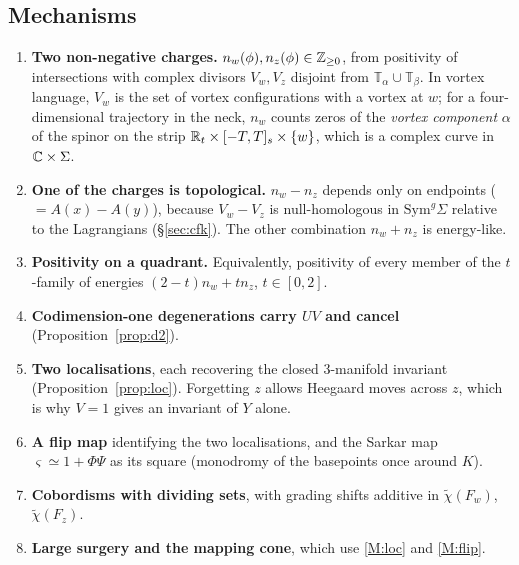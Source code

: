 \subsection{Mechanisms}
\begin{enumerate}[label=(M\arabic*),leftmargin=2.6em]
\item\label{M:charges} \textbf{Two non-negative charges.}  $n_w(\phi),n_z(\phi)\in\mathbb{Z}_{\ge0}$, from positivity
of intersections with complex divisors $V_w,V_z$ disjoint from $\mathbb T_\alpha\cup\mathbb T_\beta$.
In vortex language, $V_w$ is the set of vortex configurations with a vortex at $w$; for a
four-dimensional trajectory in the neck, $n_w$ counts zeros of the \emph{vortex component} $\alpha$
of the spinor on the strip $\mathbb{R}_t\times[-T,T]_s\times\{w\}$, which is a complex curve in $\mathbb{C}\times\Sigma$.
\item\label{M:alex} \textbf{One of the charges is topological.} $n_w-n_z$ depends only on endpoints
($=A(x)-A(y)$), because $V_w-V_z$ is null-homologous in $\mathrm{Sym}^g\Sigma$ relative to the Lagrangians
(\S\ref{sec:cfk}).  The other combination $n_w+n_z$ is energy-like.
\item\label{M:quadrant} \textbf{Positivity on a quadrant.} Equivalently, positivity of every member of
the $t$-family of energies $(2-t)n_w+tn_z$, $t\in[0,2]$.
\item\label{M:degen} \textbf{Codimension-one degenerations carry $UV$ and cancel} (Proposition~\ref{prop:d2}).
\item\label{M:loc} \textbf{Two localisations}, each recovering the closed $3$-manifold invariant
(Proposition~\ref{prop:loc}).  Forgetting $z$ allows Heegaard moves across $z$, which is why
$V=1$ gives an invariant of $Y$ alone.
\item\label{M:flip} \textbf{A flip map} identifying the two localisations, and the Sarkar map
$\varsigma\simeq 1+\Phi\Psi$ as its square (monodromy of the basepoints once around $K$).
\item\label{M:cob} \textbf{Cobordisms with dividing sets}, with grading shifts additive in
$\tilde\chi(F_w)$, $\tilde\chi(F_z)$.
\item\label{M:surg} \textbf{Large surgery and the mapping cone}, which use \ref{M:loc} and \ref{M:flip}.
\end{enumerate}

